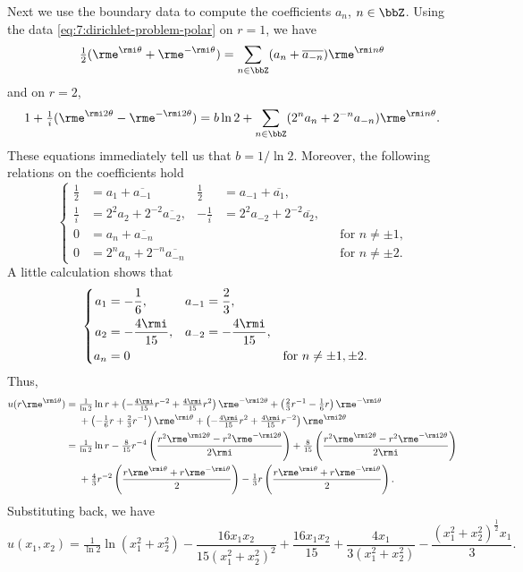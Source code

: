 \begin{solution}
  Next we use the boundary data to compute the coefficients \(a_n\),
  \(n\in\bbZ\). Using the data \eqref{eq:7:dirichlet-problem-polar} on
  \(r=1\), we have
  \begin{equation}
    \label{eq:7:data-r-1}
    \tfrac{1}{2}(\rme^{\rmi\theta}+\rme^{-\rmi\theta})%
    =\sum_{n\in\bbZ}(a_n+\overline{a_{-n}})\rme^{\rmi n\theta}
  \end{equation}
  and on \(r=2\),
  \begin{equation}
    \label{eq:7:data-r-2}
    1+\tfrac{1}{i}(\rme^{\rmi 2\theta}-\rme^{-\rmi 2\theta})
    = b\ln 2+\sum_{n\in\bbZ}(2^na_n+2^{-n}a_{-n})\rme^{\rmi n\theta}.
  \end{equation}
  These equations immediately tell us that \(b=1/{\ln 2}\). Moreover, the
  following relations on the coefficients hold
  \[
    \left\{
    \begin{aligned}
      \frac{1}{2}&=a_1+\overline{a_{-1}}
      &\frac{1}{2}&=a_{-1}+\overline{a_1},\\
      \frac{1}{i}&=2^2a_2+2^{-2}\overline{a_{-2}},
      &-\frac{1}{i}&=2^2a_{-2}+2^{-2}\overline{a_{2}},\\
      0&=a_n+\overline{a_{-n}}&&&&\text{for \(n\neq\pm 1\),}\\
      0&=2^{n}a_n+2^{-n}\overline{a_{-n}}&&&&\text{for \(n\neq\pm 2\).}
    \end{aligned}
    \right.
  \]
  A little calculation shows that
  \[
    \left\{
      \begin{aligned}
        a_1&=-\frac{1}{6},&a_{-1}&=\frac{2}{3},\\
        a_2&=-\frac{4\rmi}{15},&a_{-2}&=-\frac{4\rmi}{15},\\
        a_n&=0&&&&\text{for \(n\neq \pm 1,\pm 2\).}
      \end{aligned}
    \right.
  \]
  Thus,
  \[
    \begin{aligned}
      u(r\rme^{\rmi\theta})
      &=\tfrac{1}{\ln 2}\ln r
      +\left(-\tfrac{4\rmi}{15}r^{-2}+\tfrac{4\rmi}{15}r^2\right)\rme^{-\rmi
        2\theta} +\left(\tfrac{2}{3}r^{-1}-\tfrac{1}{6}r\right)\rme^{-\rmi\theta}\\
      &\phantom{{}={}}
      +\left(-\tfrac{1}{6}r+\tfrac{2}{3}r^{-1}\right)\rme^{\rmi\theta}
      +\left(-\tfrac{4\rmi}{15}r^2+\tfrac{4\rmi}{15}r^{-2}\right)\rme^{\rmi
        2\theta}\\
      &=\tfrac{1}{\ln 2}\ln r-\tfrac{8}{15}r^{-4}
      \left(\frac{r^2\rme^{\rmi 2\theta}-r^2\rme^{-\rmi 2\theta}}{2\rmi}\right)
      +\tfrac{8}{15}
      \left(\frac{r^2\rme^{\rmi 2\theta}-r^2\rme^{-\rmi
            2\theta}}{2\rmi}\right)\\
      &\phantom{{}={}}
      +\tfrac{4}{3}r^{-2}
      \left(\frac{r\rme^{\rmi\theta}+r\rme^{-\rmi\theta}}{2}\right)
      -\tfrac{1}{3}r
      \left(\frac{r\rme^{\rmi\theta}+r\rme^{-\rmi\theta}}{2}\right).
    \end{aligned}
  \]
  Substituting back, we have
  \[
    u(x_1,x_2)=\tfrac{1}{\ln 2}\ln(x_1^2+x_2^2)
    -\frac{16x_1x_2}{15{(x_1^2+x_2^2)}^2}+\frac{16x_1x_2}{15}
    +\frac{4x_1}{3(x_1^2+x_2^2)}-\frac{{(x_1^2+x_2^2)}^{\frac{1}{2}}x_1}{3}.
  \]
\end{solution}
\newpage

